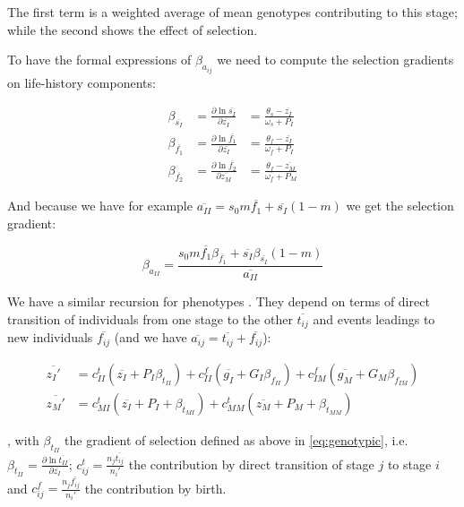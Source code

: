 The first term is a weighted average of mean genotypes contributing to this stage; while the second shows the effect of selection.

To have the formal expressions of $\beta_{a_{ij}}$ we need to compute the selection gradients on life-history components:

\begin{equation}
	\label{eq:selgradlfh}
	\begin{aligned}
	\beta_{\overline{s_I}} &= \frac{\partial \ln \overline{s_I}}{\partial \overline{z_I}} &= \frac{\theta_s - \overline{z_I}}{\omega_s + P_I} \\
	\beta_{\overline{f_1}} &= \frac{\partial \ln \overline{f_1}}{\partial \overline{z_I}} &= \frac{\theta_f - \overline{z_I}}{\omega_f + P_I} \\
	\beta_{\overline{f_2}} &= \frac{\partial \ln \overline{f_2}}{\partial \overline{z_M}} &= \frac{\theta_f - \overline{z_M}}{\omega_f + P_M}
	\end{aligned}
\end{equation}

And because we have for example $\overline{a_{II}} = s_0 m \overline{f_1} + \overline{s_I} (1-m)$ we get the selection gradient:

\begin{equation}
	\label{eq:selgradaII}
	\beta_{a_{II}} = \frac{s_0 m \overline{f_1} \beta_{\overline{f_1}} + \overline{s_I} \beta_{\overline{s_I}} (1-m)}{\overline{a_{II}}}
\end{equation}

We have a similar recursion for phenotypes \citep{barfield_evolution_2011}. They depend on terms of direct transition of individuals from one stage to the other $\overline{t_{ij}}$ and events leadings to new individuals $\overline{f_{ij}}$ (and we have $\overline{a_{ij}} = \overline{t_{ij}} + \overline{f_{ij}}$):

\begin{subequations}
	\begin{align}
	\label{eq:phenotypic}
	\overline{z_I'} &= c_{II}^t (\overline{z_I} + P_I \beta_{t_{II}}) + c_{II}^f (\overline{g_I} + G_I \beta_{f_{II}}) + c_{IM}^f (\overline{g_M} + G_M \beta_{f_{IM}}) \\
	\overline{z_M'} &= c_{MI}^t (\overline{z_I} + P_I + \beta_{t_{MI}}) + c_{MM}^t (\overline{z_M} + P_M + \beta_{t_{MM}})
	\end{align}
\end{subequations}

, with $\beta_{t_{II}}$ the gradient of selection defined as above in \autoref{eq:genotypic}, i.e. $\beta_{t_{II}} = \frac{\partial \ln \overline{t_{II}}}{\partial \overline{z_I}}$; $c_{ij}^t = \frac{n_j \overline{t_{ij}}}{n_i'}$ the contribution by direct transition of stage $j$ to stage $i$ and $c_{ij}^f = \frac{n_j \overline{f_{ij}}}{n_i'}$ the contribution by birth.

